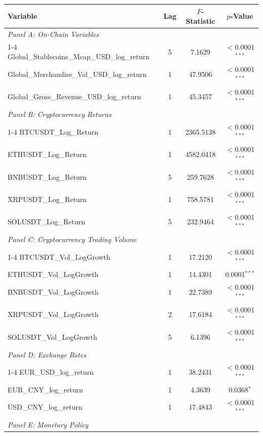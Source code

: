 {\renewcommand{\arraystretch}{0.90}
\begin{tabular}{lccc}
    \toprule
    \textbf{Variable} & \textbf{Lag} & \textbf{$F$-Statistic} & \textbf{$p$-Value} \\ 
    \midrule
    \multicolumn{4}{l}{\textit{Panel A: On-Chain Variables}} \\ 
    \cmidrule(lr){1-4}
    Global\_Stablecoins\_Mcap\_USD\_log\_return & 5 & 7.1629 & $<$0.0001$^{***}$ \\ 
    Global\_Merchandise\_Vol\_USD\_log\_return & 1 & 47.9506 & $<$0.0001$^{***}$ \\ 
    Global\_Gross\_Revenue\_USD\_log\_return & 1 & 45.3457 & $<$0.0001$^{***}$ \\ 
    \midrule
    \multicolumn{4}{l}{\textit{Panel B: Cryptocurrency Returns}} \\ 
    \cmidrule(lr){1-4}
    BTCUSDT\_Log\_Return & 1 & 2365.5138 & $<$0.0001$^{***}$ \\ 
    ETHUSDT\_Log\_Return & 1 & 4582.0418 & $<$0.0001$^{***}$ \\ 
    BNBUSDT\_Log\_Return & 5 & 259.7628 & $<$0.0001$^{***}$ \\ 
    XRPUSDT\_Log\_Return & 1 & 758.5781 & $<$0.0001$^{***}$ \\ 
    SOLUSDT\_Log\_Return & 5 & 232.9464 & $<$0.0001$^{***}$ \\ 
    \midrule
    \multicolumn{4}{l}{\textit{Panel C: Cryptocurrency Trading Volume}} \\ 
    \cmidrule(lr){1-4}
    BTCUSDT\_Vol\_LogGrowth & 1 & 17.2120 & $<$0.0001$^{***}$ \\ 
    ETHUSDT\_Vol\_LogGrowth & 1 & 14.4301 & 0.0001$^{***}$ \\ 
    BNBUSDT\_Vol\_LogGrowth & 1 & 22.7389 & $<$0.0001$^{***}$ \\ 
    XRPUSDT\_Vol\_LogGrowth & 2 & 17.6184 & $<$0.0001$^{***}$ \\ 
    SOLUSDT\_Vol\_LogGrowth & 5 & 6.1396 & $<$0.0001$^{***}$ \\ 
    \midrule
    \multicolumn{4}{l}{\textit{Panel D: Exchange Rates}} \\ 
    \cmidrule(lr){1-4}
    EUR\_USD\_log\_return & 1 & 38.2431 & $<$0.0001$^{***}$ \\ 
    EUR\_CNY\_log\_return & 1 & 4.3639 & 0.0368$^{*}$ \\ 
    USD\_CNY\_log\_return & 1 & 17.4843 & $<$0.0001$^{***}$ \\ 
    \midrule
    \multicolumn{4}{l}{\textit{Panel E: Monetary Policy}} \\ 

\end{tabular}}
